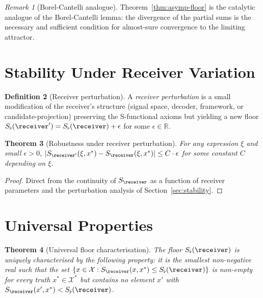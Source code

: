 \documentclass[11pt,a4paper]{article}
\theoremstyle{thmstyle}
\newtheorem{theorem}{Theorem}[section]
\theoremstyle{thmstyle}
\theoremstyle{definition}
\newtheorem{definition}[theorem]{Definition}
\theoremstyle{remark}
\newtheorem{remark}[theorem]{Remark}
\newcommand{\Real}{\mathbb{R}}
\newcommand{\Cands}{\mathcal{X}}
\newcommand{\Truth}{\mathcal{X}^{*}}
\newcommand{\Sscalar}{S}
\newcommand{\Sfloor}{S_{\flat}}
\begin{document}
\begin{remark}[Borel-Cantelli analogue]
\label{rem:borel-cantelli}
Theorem~\ref{thm:asymp-floor} is the catalytic
analogue of the Borel-Cantelli lemma: the
divergence of the partial sums is the necessary
and sufficient condition for almost-sure
convergence to the limiting attractor.
\end{remark}

\section{Stability Under Receiver Variation}
\label{sec:rec-var}

\begin{definition}[Receiver perturbation]
\label{def:rec-pert}
A \emph{receiver perturbation} is a small
modification of the receiver's structure (signal
space, decoder, framework, or candidate-projection)
preserving the S-functional axioms but yielding a
new floor $\Sfloor(\receiver') = \Sfloor(\receiver)
+ \epsilon$ for some $\epsilon \in \Real$.
\end{definition}

\begin{theorem}[Robustness under receiver
perturbation]\label{thm:robust-rec-pert}
For any expression $\xi$ and small $\epsilon > 0$,
$|\Sscalar_{\receiver'}(\xi, x^{*}) -
\Sscalar_{\receiver}(\xi, x^{*})| \leq C \cdot
\epsilon$ for some constant $C$ depending on
$\xi$.
\end{theorem}

\begin{proof}
Direct from the continuity of
$\Sscalar_{\receiver}$ as a function of receiver
parameters and the perturbation analysis of
Section~\ref{sec:stability}.
\end{proof}

\section{Universal Properties}
\label{sec:universal-props}

\begin{theorem}[Universal floor characterisation]
\label{thm:univ-floor}
The floor $\Sfloor(\receiver)$ is uniquely
characterised by the following property: it is
the smallest non-negative real such that the set
$\{x \in \Cands : \Sscalar_{\receiver}(x, x^{*})
\leq \Sfloor(\receiver)\}$ is non-empty for every
truth $x^{*} \in \Truth$ but contains no element
$x'$ with $\Sscalar_{\receiver}(x', x^{*}) <
\Sfloor(\receiver)$.
\end{theorem}
\end{document}
